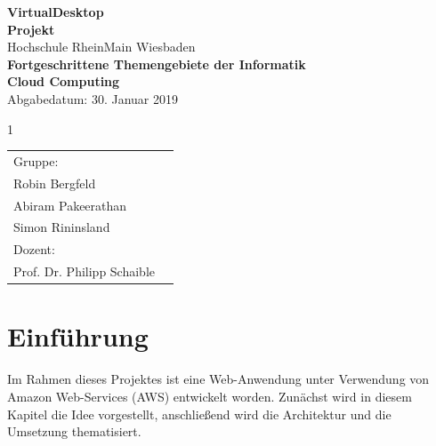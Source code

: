 \documentclass[a4paper, 12pt]{scrreprt}
\begin{document}
\begin{titlepage}
    \begin{center}
    \LARGE \textbf{VirtualDesktop} \\
    \vspace{2.5cm}
    \large\textbf{Projekt}\\
    \vspace{2.5cm}
    \normalsize
    Hochschule RheinMain Wiesbaden \\
    \vspace{2cm}
    \large \textbf{Fortgeschrittene Themengebiete der Informatik\\ Cloud Computing\\}
    \vspace{1cm}
    \normalsize
    Abgabedatum: 30. Januar 2019\\
    \vspace{2.7cm}
    \end{center}1
 \normalsize{
    \begin{tabular}{ll}
    	Gruppe: & \\
    	Robin Bergfeld & \\
    	Abiram Pakeerathan & \\
    	Simon Rininsland & \\[0.5cm]
    	Dozent: &\\
        Prof. Dr. Philipp Schaible & \\
    \end{tabular}
    }
\end{titlepage}



\clearpage
\tableofcontents
\clearpage



\chapter{Einführung}
Im Rahmen dieses Projektes ist eine Web-Anwendung unter Verwendung von Amazon Web-Services (AWS) entwickelt worden. Zunächst wird in diesem Kapitel die Idee vorgestellt, anschließend wird die Architektur und die Umsetzung thematisiert.
\end{document}
